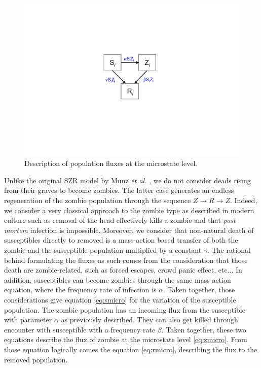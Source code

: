 \documentclass[11pt]{article} %
\begin{document}
\begin{figure}[h!]
\centerline{
\includegraphics[scale=0.55]{../images/Powerpoint_figures/microstate.pdf}}
\caption{Description of population fluxes at the microstate level. \label{microstate} }
\end{figure}

Unlike the original SZR model by Munz \textit{et al.} \cite{munz2009zombies}, we do not consider deads rising from their graves to become zombies. The latter case generates an endless regeneration of the zombie population through the sequence $Z\rightarrow R\rightarrow Z$. Indeed, we consider a very classical approach to the zombie type as described in modern culture such as removal of the head effectively kills a zombie and that \textit{post mortem} infection is impossible.  Moreover, we consider that non-natural death of susceptibles directly to removed is a mass-action based transfer of both the zombie and the susceptible population multiplied by a constant $\gamma$. The rational behind formulating the fluxes as such comes from the consideration that those death are zombie-related, such as forced escapes, crowd panic effect, etc... In addition, susceptibles can become zombies through the same mass-action equation, where the frequency rate of infection is $\alpha$. Taken together, those considerations give equation \eqref{eq:smicro} for the variation of the susceptible population. The zombie population has an incoming flux from the susceptible with parameter $\alpha$ as previously described. They can also get killed through encounter with susceptible with a frequency rate $\beta$. Taken together, these two equations describe the flux of zombie at the microstate level \eqref{eq:zmicro}. From those equation logically comes the equation \eqref{eq:rmicro}, describing the flux to the removed population. 
\end{document}
